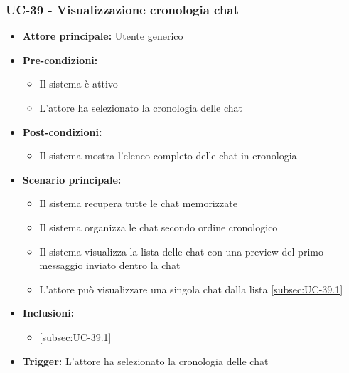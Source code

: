 \documentclass[a4paper,12pt]{article}
\begin{document}
\subsubsection{UC-39 - Visualizzazione cronologia chat} \label{subsec:UC-39}
\begin{itemize}
    \item \textbf{Attore principale:} Utente generico
    \item \textbf{Pre-condizioni:}
    \begin{itemize}
        \item Il sistema è attivo
        \item L'attore ha selezionato la cronologia delle chat
    \end{itemize}
    \item \textbf{Post-condizioni:} 
    \begin{itemize}
        \item Il sistema mostra l'elenco completo delle chat in cronologia
    \end{itemize}
    \item \textbf{Scenario principale:} 
    \begin{itemize}
        \item Il sistema recupera tutte le chat memorizzate
        \item Il sistema organizza le chat secondo ordine cronologico
        \item Il sistema visualizza la lista delle chat con una preview del primo messaggio inviato dentro la chat
        \item L'attore può visualizzare una singola chat dalla lista \ref{subsec:UC-39.1}
    \end{itemize}
    \item \textbf{Inclusioni:}
    \begin{itemize}
        \item \ref{subsec:UC-39.1}
    \end{itemize}
    \item \textbf{Trigger:} L'attore ha selezionato la cronologia delle chat
\end{itemize}
\end{document}
